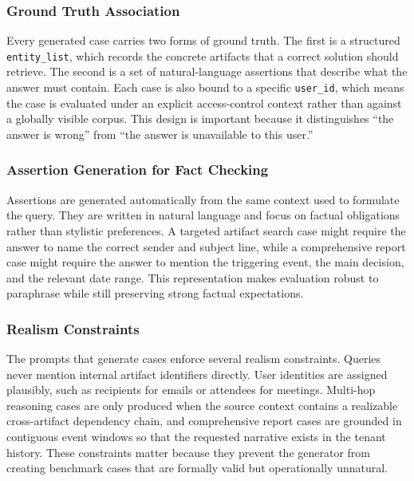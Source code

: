 \subsubsection{Ground Truth Association}

Every generated case carries two forms of ground truth. The first is a structured \texttt{entity\_list}, which records the concrete artifacts that a correct solution should retrieve. The second is a set of natural-language assertions that describe what the answer must contain. Each case is also bound to a specific \texttt{user\_id}, which means the case is evaluated under an explicit access-control context rather than against a globally visible corpus. This design is important because it distinguishes ``the answer is wrong'' from ``the answer is unavailable to this user.''

\subsubsection{Assertion Generation for Fact Checking}

Assertions are generated automatically from the same context used to formulate the query. They are written in natural language and focus on factual obligations rather than stylistic preferences. A targeted artifact search case might require the answer to name the correct sender and subject line, while a comprehensive report case might require the answer to mention the triggering event, the main decision, and the relevant date range. This representation makes evaluation robust to paraphrase while still preserving strong factual expectations.

\subsubsection{Realism Constraints}

The prompts that generate cases enforce several realism constraints. Queries never mention internal artifact identifiers directly. User identities are assigned plausibly, such as recipients for emails or attendees for meetings. Multi-hop reasoning cases are only produced when the source context contains a realizable cross-artifact dependency chain, and comprehensive report cases are grounded in contiguous event windows so that the requested narrative exists in the tenant history. These constraints matter because they prevent the generator from creating benchmark cases that are formally valid but operationally unnatural.

